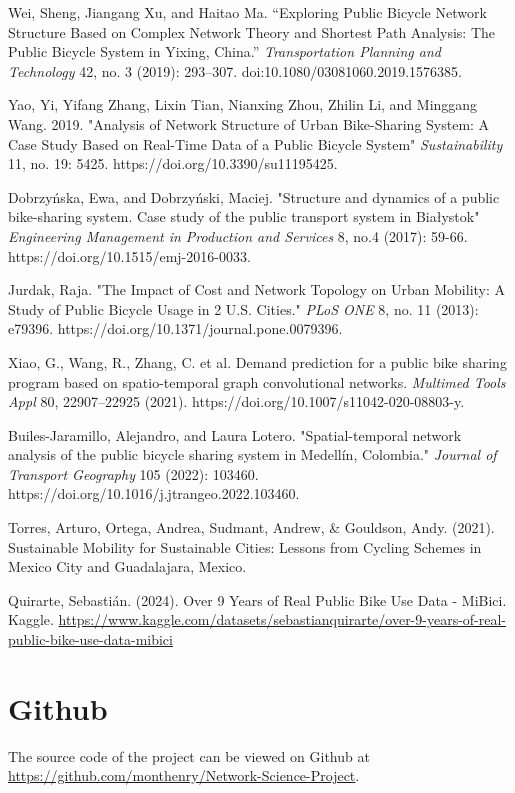 \documentclass[conference]{IEEEtran}
\begin{document}
\begin{thebibliography}{1}

Wei, Sheng, Jiangang Xu, and Haitao Ma. “Exploring Public Bicycle Network Structure Based on Complex Network Theory and Shortest Path Analysis: The Public Bicycle System in Yixing, China.” \textit{Transportation Planning and Technology} 42, no. 3 (2019): 293–307. doi:10.1080/03081060.2019.1576385.

Yao, Yi, Yifang Zhang, Lixin Tian, Nianxing Zhou, Zhilin Li, and Minggang Wang. 2019. "Analysis of Network Structure of Urban Bike-Sharing System: A Case Study Based on Real-Time Data of a Public Bicycle System" \textit{Sustainability} 11, no. 19: 5425. https://doi.org/10.3390/su11195425.

Dobrzyńska, Ewa, and Dobrzyński, Maciej. "Structure and dynamics of a public bike-sharing system. Case study of the public transport system in Białystok" \textit{Engineering Management in Production and Services} 8, no.4 (2017): 59-66. https://doi.org/10.1515/emj-2016-0033.

Jurdak, Raja. "The Impact of Cost and Network Topology on Urban Mobility: A Study of Public Bicycle Usage in 2 U.S. Cities." \textit{PLoS ONE} 8, no. 11 (2013): e79396. https://doi.org/10.1371/journal.pone.0079396.

Xiao, G., Wang, R., Zhang, C. et al. Demand prediction for a public bike sharing program based on spatio-temporal graph convolutional networks. \textit{Multimed Tools Appl} 80, 22907–22925 (2021). https://doi.org/10.1007/s11042-020-08803-y.

Builes-Jaramillo, Alejandro, and Laura Lotero. "Spatial-temporal network analysis of the public bicycle sharing system in Medellín, Colombia." \textit{Journal of Transport Geography} 105 (2022): 103460. https://doi.org/10.1016/j.jtrangeo.2022.103460.

Torres, Arturo, Ortega, Andrea, Sudmant, Andrew, \& Gouldson, Andy. (2021). Sustainable Mobility for Sustainable Cities: Lessons from Cycling Schemes in Mexico City and Guadalajara, Mexico.

Quirarte, Sebastián. (2024). Over 9 Years of Real Public Bike Use Data - MiBici. Kaggle. \url{https://www.kaggle.com/datasets/sebastianquirarte/over-9-years-of-real-public-bike-use-data-mibici}

\end{thebibliography}

\section{Github}

The source code of the project can be viewed on Github at \url{https://github.com/monthenry/Network-Science-Project}.
\end{document}
